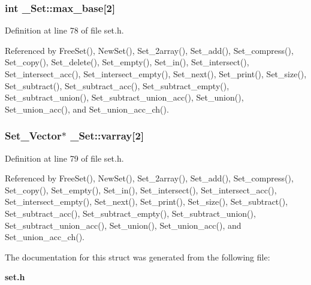 \subsubsection{\setlength{\rightskip}{0pt plus 5cm}int \bf{\_\-Set::max\_\-base}[2]}\label{struct__Set_a6d62f361cf8e816da56805108001ee5}




Definition at line 78 of file set.h.

Referenced by Free\-Set(), New\-Set(), Set\_\-2array(), Set\_\-add(), Set\_\-compress(), Set\_\-copy(), Set\_\-delete(), Set\_\-empty(), Set\_\-in(), Set\_\-intersect(), Set\_\-intersect\_\-acc(), Set\_\-intersect\_\-empty(), Set\_\-next(), Set\_\-print(), Set\_\-size(), Set\_\-subtract(), Set\_\-subtract\_\-acc(), Set\_\-subtract\_\-empty(), Set\_\-subtract\_\-union(), Set\_\-subtract\_\-union\_\-acc(), Set\_\-union(), Set\_\-union\_\-acc(), and Set\_\-union\_\-acc\_\-ch().
\subsubsection{\setlength{\rightskip}{0pt plus 5cm}\bf{Set\_\-Vector}$\ast$ \bf{\_\-Set::varray}[2]}\label{struct__Set_067e3c97731fdaf390a308f9ca579f45}




Definition at line 79 of file set.h.

Referenced by Free\-Set(), New\-Set(), Set\_\-2array(), Set\_\-add(), Set\_\-compress(), Set\_\-copy(), Set\_\-empty(), Set\_\-in(), Set\_\-intersect(), Set\_\-intersect\_\-acc(), Set\_\-intersect\_\-empty(), Set\_\-next(), Set\_\-print(), Set\_\-size(), Set\_\-subtract(), Set\_\-subtract\_\-acc(), Set\_\-subtract\_\-empty(), Set\_\-subtract\_\-union(), Set\_\-subtract\_\-union\_\-acc(), Set\_\-union(), Set\_\-union\_\-acc(), and Set\_\-union\_\-acc\_\-ch().

The documentation for this struct was generated from the following file:\begin{CompactItemize}
\item 
\bf{set.h}\end{CompactItemize}
